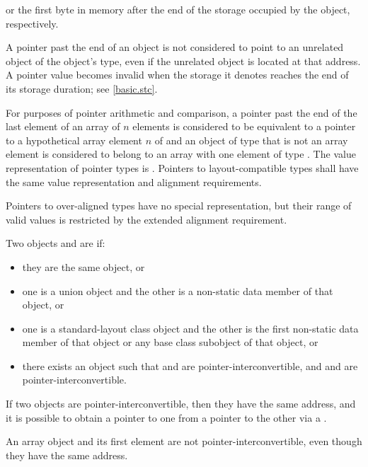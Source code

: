 or the first byte in memory
after the end of the storage occupied by the object,
respectively.
\begin{note}
A pointer past the end of an object
is not considered to point to an unrelated object
of the object's type,
even if the unrelated object is located at that address.
A pointer value becomes invalid
when the storage it denotes
reaches the end of its storage duration;
see \ref{basic.stc}.
\end{note}
For purposes of pointer arithmetic
and comparison,
a pointer past the end of the last element of
an array  of $n$ elements
is considered to be equivalent to
a pointer to a hypothetical array element $n$ of  and
an object of type  that is not an array element
is considered to belong to an array with one element of type .
The value representation of
pointer types is . Pointers to
layout-compatible types shall
have the same value representation and alignment
requirements.
\begin{note}
Pointers to over-aligned types have no special
representation, but their range of valid values is restricted by the extended
alignment requirement.
\end{note}

\pnum
Two objects  and  are  if:
\begin{itemize}
\item
they are the same object, or
\item
one is a union object and
the other is a non-static data member of that object, or
\item
one is a standard-layout class object and
the other is the first non-static data member of that object or
any base class subobject of that object, or
\item
there exists an object  such that
 and  are pointer-interconvertible, and
 and  are pointer-interconvertible.
\end{itemize}
If two objects are pointer-interconvertible,
then they have the same address,
and it is possible to obtain a pointer to one
from a pointer to the other
via a .
\begin{note}
An array object and its first element are not pointer-interconvertible,
even though they have the same address.
\end{note}

